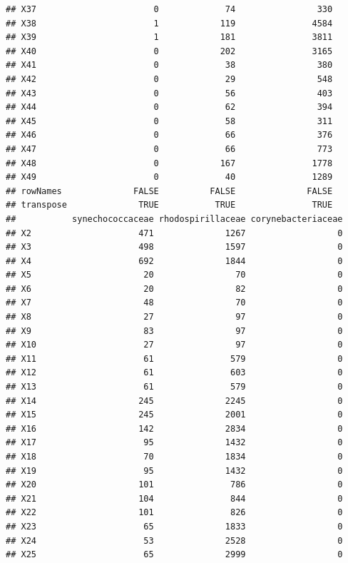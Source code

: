 \documentclass[10pt,handout,english]{beamer}\usepackage[]{graphicx}\usepackage[]{color}
\makeatletter
\newenvironment{kframe}{%
 \def\at@end@of@kframe{}%
 \ifinner\ifhmode%
  \def\at@end@of@kframe{\end{minipage}}%
  \begin{minipage}{\columnwidth}%
 \fi\fi%
 \def\FrameCommand##1{\hskip\@totalleftmargin \hskip-\fboxsep
 \colorbox{shadecolor}{##1}\hskip-\fboxsep
     \hskip-\linewidth \hskip-\@totalleftmargin \hskip\columnwidth}%
 \MakeFramed {\advance\hsize-\width
   \@totalleftmargin\z@ \linewidth\hsize
   \@setminipage}}%
 {\par\unskip\endMakeFramed%
 \at@end@of@kframe}
\newenvironment{knitrout}{}{} %
\makeatother
\begin{document}
\begin{frame}[fragile]
\begin{knitrout}
\begin{kframe}
\begin{verbatim}
## X37                       0             74                330
## X38                       1            119               4584
## X39                       1            181               3811
## X40                       0            202               3165
## X41                       0             38                380
## X42                       0             29                548
## X43                       0             56                403
## X44                       0             62                394
## X45                       0             58                311
## X46                       0             66                376
## X47                       0             66                773
## X48                       0            167               1778
## X49                       0             40               1289
## rowNames              FALSE          FALSE              FALSE
## transpose              TRUE           TRUE               TRUE
##           synechococcaceae rhodospirillaceae corynebacteriaceae
## X2                     471              1267                  0
## X3                     498              1597                  0
## X4                     692              1844                  0
## X5                      20                70                  0
## X6                      20                82                  0
## X7                      48                70                  0
## X8                      27                97                  0
## X9                      83                97                  0
## X10                     27                97                  0
## X11                     61               579                  0
## X12                     61               603                  0
## X13                     61               579                  0
## X14                    245              2245                  0
## X15                    245              2001                  0
## X16                    142              2834                  0
## X17                     95              1432                  0
## X18                     70              1834                  0
## X19                     95              1432                  0
## X20                    101               786                  0
## X21                    104               844                  0
## X22                    101               826                  0
## X23                     65              1833                  0
## X24                     53              2528                  0
## X25                     65              2999                  0

\end{verbatim}
\end{kframe}
\end{knitrout}
\end{frame}
\end{document}
